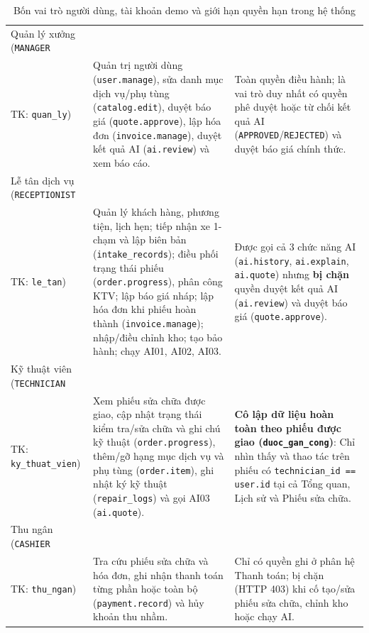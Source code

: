 \begin{table}[H]
\centering
\small
\caption{Bốn vai trò người dùng, tài khoản demo và giới hạn quyền hạn trong hệ thống}
\label{tab:g-actors}
\begin{tabularx}{\textwidth}{|L{3.2cm}|Y|Y|}
\hline
{} &  & \\
\hline
Quản lý xưởng (\texttt{MANAGER}\\TK: \texttt{quan\_ly}) & Quản trị người dùng (\texttt{user.manage}), sửa danh mục dịch vụ/phụ tùng (\texttt{catalog.edit}), duyệt báo giá (\texttt{quote.approve}), lập hóa đơn (\texttt{invoice.manage}), duyệt kết quả AI (\texttt{ai.review}) và xem báo cáo. & Toàn quyền điều hành; là vai trò duy nhất có quyền phê duyệt hoặc từ chối kết quả AI (\texttt{APPROVED}/\texttt{REJECTED}) và duyệt báo giá chính thức. \\
\hline
Lễ tân dịch vụ (\texttt{RECEPTIONIST}\\TK: \texttt{le\_tan}) & Quản lý khách hàng, phương tiện, lịch hẹn; tiếp nhận xe 1-chạm và lập biên bản (\texttt{intake\_records}); điều phối trạng thái phiếu (\texttt{order.progress}), phân công KTV; lập báo giá nháp; lập hóa đơn khi phiếu hoàn thành (\texttt{invoice.manage}); nhập/điều chỉnh kho; tạo bảo hành; chạy AI01, AI02, AI03. & Được gọi cả 3 chức năng AI (\texttt{ai.history}, \texttt{ai.explain}, \texttt{ai.quote}) nhưng \textbf{bị chặn} quyền duyệt kết quả AI (\texttt{ai.review}) và duyệt báo giá (\texttt{quote.approve}). \\
\hline
Kỹ thuật viên (\texttt{TECHNICIAN}\\TK: \texttt{ky\_thuat\_vien}) & Xem phiếu sửa chữa được giao, cập nhật trạng thái kiểm tra/sửa chữa và ghi chú kỹ thuật (\texttt{order.progress}), thêm/gỡ hạng mục dịch vụ và phụ tùng (\texttt{order.item}), ghi nhật ký kỹ thuật (\texttt{repair\_logs}) và gọi AI03 (\texttt{ai.quote}). & \textbf{Cô lập dữ liệu hoàn toàn theo phiếu được giao (\texttt{duoc\_gan\_cong})}: Chỉ nhìn thấy và thao tác trên phiếu có \texttt{technician\_id == user.id} tại cả Tổng quan, Lịch sử và Phiếu sửa chữa. \\
\hline
Thu ngân (\texttt{CASHIER}\\TK: \texttt{thu\_ngan}) & Tra cứu phiếu sửa chữa và hóa đơn, ghi nhận thanh toán từng phần hoặc toàn bộ (\texttt{payment.record}) và hủy khoản thu nhầm. & Chỉ có quyền ghi ở phân hệ Thanh toán; bị chặn (HTTP 403) khi cố tạo/sửa phiếu sửa chữa, chỉnh kho hoặc chạy AI. \\
\hline
\end{tabularx}
\end{table}

